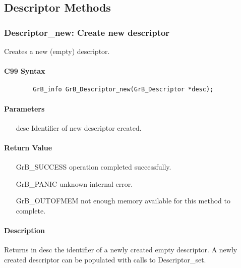 \subsection{Descriptor Methods}

\subsubsection{{\sf Descriptor\_new}: Create new descriptor}

Creates a new (empty) descriptor.

\paragraph{C99 Syntax}

\begin{verbatim}
        GrB_info GrB_Descriptor_new(GrB_Descriptor *desc);
\end{verbatim}

\paragraph{Parameters}

\begin{itemize}[leftmargin=1.1in]
    \item[{\sf desc}] Identifier of new descriptor created.
\end{itemize}

\paragraph{Return Value}

\begin{itemize}[leftmargin=2.1in]
\item[{\sf GrB\_SUCCESS}]           operation completed successfully.
\item[{\sf GrB\_PANIC}]             unknown internal error.
\item[{\sf GrB\_OUTOFMEM}]          not enough memory available for this method to complete.
\end{itemize}

\paragraph{Description}

Returns in {\sf desc} the identifier of a newly created empty descriptor.
A newly created descriptor can be populated with calls to {\sf Descriptor\_set}.


